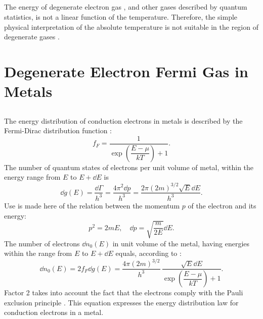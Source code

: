 \subsection{}\label{41.3.5} The energy of degenerate electron gas , and other gases described by quantum statistics, is not a linear function of the temperature. Therefore, the simple physical interpretation of the absolute temperature  is not suitable in the region of degenerate gases .

\section{Degenerate Electron Fermi Gas in Metals}
\label{sec-41.4} 

\subsection{}\label{41.4.1} The energy distribution of conduction electrons in metals is described by the Fermi-Dirac distribution function :
\begin{equation*}%
f_{F} = \frac{1}{\exp \left(\dfrac{E - \mu}{kT} \right) +1}.
\end{equation*}
The number of quantum states of electrons per unit volume of
metal, within the energy range from $E$ to $E + \dd E$  is
\begin{equation*}%
\dd g(E) = \frac{\dd \Gamma}{h^{3}} =\frac{4 \pi^{2 } \dd p}{h^{3}}= \frac{2 \pi (2m)^{3/2} \sqrt{E} \dd E}{h^{3}}.
\end{equation*}
Use is made here of the relation between the momentum $p$ of
the electron and its energy:
\begin{equation*}%
p^{2} = 2mE, \quad \dd p = \sqrt{\frac{m}{2E}} \dd E.
\end{equation*}
The number of electrons $\dd n_{0} (E)$ in unit volume of the metal, having energies within the range from $E$ to $E + \dd E$ equals, according to :
\begin{equation*}%
\dd n_{0} (E) = 2 f_{F} \dd g(E)  = \frac{4 \pi (2m)^{3/2}}{h^{3}} \, \frac{\sqrt{E} \dd E}{\exp \left(\dfrac{E - \mu}{kT} \right) + 1}.
\end{equation*}
Factor 2 takes into account the fact that the electrons comply with the Pauli exclusion principle . This equation expresses the energy distribution law for conduction electrons in a metal.

